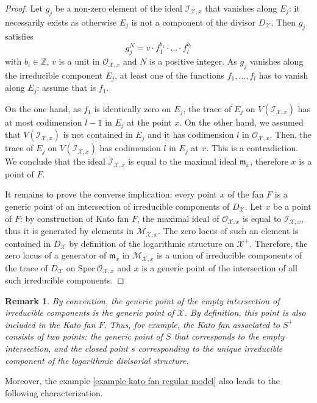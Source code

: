 \documentclass{amsart}%
\numberwithin{equation}{subsection}
\theoremstyle{plain2}
\theoremstyle{definition2}
\newtheorem{rem}[equation]{Remark}
\theoremstyle{stepstyle}
\theoremstyle{point}
\theoremstyle{subpoint}
\newcommand{\Z}{\ensuremath{\mathbb{Z}}}
\newcommand{\cX}{\ensuremath{\mathscr{X}}}
\newcommand{\caO}{\ensuremath{\mathcal{O}}}
\newcommand{\caI}{\ensuremath{\mathcal{I}}}
\newcommand{\Spec}{\ensuremath{\mathrm{Spec}\,}}
\begin{document}
\begin{proof}
Let $g_j$ be a non-zero element of the ideal $\caI_{\cX,x}$ that vanishes along $E_j$: it necessarily exists as otherwise $E_j$ is not a component of the divisor $D_{\cX}$. Then $g_j$ satisfies $$g_{j}^N = v \cdot f_1^{b_1} \cdot \ldots \cdot f_l^{b_l}$$ with $b_i \in \Z$, $v$ is a unit in $\caO_{\cX,x}$ and $N$ is a positive integer. As $g_j$ vanishes along the irreducible component $E_j$, at least one of the functions $f_1,\ldots,f_l$ has to vanish along $E_j$: assume that is $f_1$.

On the one hand, as $f_1$ is identically zero on $E_j$, the trace of $E_j$ on $V(\caI_{\cX,x})$ has at most codimension $l-1$ in $E_j$ at the point $x$. On the other hand, we assumed that $V(\caI_{\cX,x})$ is not contained in $E_j$ and it has codimension $l$ in $\caO_{\cX,x}$. Then, the trace of $E_j$ on $V(\caI_{\cX,x})$ has codimension $l$ in $E_j$ at $x$. This is a contradiction. We conclude that the ideal $\caI_{\cX,x}$ is equal to the maximal ideal $\mathfrak{m}_x$, therefore $x$ is a point of $F$.

It remains to prove the converse implication: every point $x$ of the fan $F$ is a generic point of an intersection of irreducible components of $D_{\cX}$. Let $x$ be a point of $F$: by construction of Kato fan $F$, the maximal ideal of $\mathcal{O}_{\cX,x}$ is equal to $\mathcal{I}_{\cX,x}$, thus it is generated by elements in $\mathcal{M}_{\cX,x}$. The zero locus of such an element is contained in $D_{\cX}$ by definition of the logarithmic structure on $\cX^+$. Therefore, the zero locus of a generator of $\mathfrak{m}_x$ in $\mathcal{M}_{\cX,x}$ is a union of irreducible components of the trace of $D_{\cX}$ on $\Spec \mathcal{O}_{\cX,x}$ and $x$ is a generic point of the intersection of all such irreducible components.
\end{proof}

\begin{rem}
By convention, the generic point of the empty intersection of irreducible components is the generic point of $\cX$. By definition, this point is also included in the Kato fan $F$. Thus, for example, the Kato fan associated to $S^+$ consists of two points: the generic point of $S$ that corresponds to the empty intersection, and the closed point $s$ corresponding to the unique irreducible component of the logarithmic divisorial structure.  
\end{rem}

Moreover, the example \ref{example kato fan regular model} also leads to the following characterization.
\end{document}
